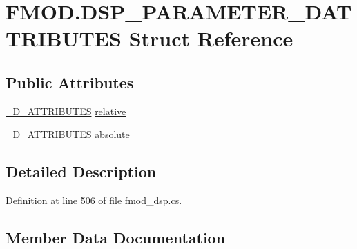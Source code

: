 \hypertarget{struct_f_m_o_d_1_1_d_s_p___p_a_r_a_m_e_t_e_r__3_d_a_t_t_r_i_b_u_t_e_s}{}\section{F\+M\+O\+D.\+D\+S\+P\+\_\+\+P\+A\+R\+A\+M\+E\+T\+E\+R\+\_\+D\+A\+T\+T\+R\+I\+B\+U\+T\+ES Struct Reference}
\label{struct_f_m_o_d_1_1_d_s_p___p_a_r_a_m_e_t_e_r__3_d_a_t_t_r_i_b_u_t_e_s}
\subsection*{Public Attributes}
\begin{DoxyCompactItemize}
\item 
\hyperlink{struct_f_m_o_d_1_1__3_d___a_t_t_r_i_b_u_t_e_s}{\+\_\+D\+\_\+\+A\+T\+T\+R\+I\+B\+U\+T\+ES} \hyperlink{struct_f_m_o_d_1_1_d_s_p___p_a_r_a_m_e_t_e_r__3_d_a_t_t_r_i_b_u_t_e_s_a60dc1cb77deef002ff02c79c5e0c447f}{relative}
\item 
\hyperlink{struct_f_m_o_d_1_1__3_d___a_t_t_r_i_b_u_t_e_s}{\+\_\+D\+\_\+\+A\+T\+T\+R\+I\+B\+U\+T\+ES} \hyperlink{struct_f_m_o_d_1_1_d_s_p___p_a_r_a_m_e_t_e_r__3_d_a_t_t_r_i_b_u_t_e_s_a5d70b1e9bbd8acd799ab13a12adeeb0f}{absolute}
\end{DoxyCompactItemize}


\subsection{Detailed Description}


Definition at line 506 of file fmod\+\_\+dsp.\+cs.



\subsection{Member Data Documentation}
\mbox{\label{struct_f_m_o_d_1_1_d_s_p___p_a_r_a_m_e_t_e_r__3_d_a_t_t_r_i_b_u_t_e_s_a5d70b1e9bbd8acd799ab13a12adeeb0f}} 
